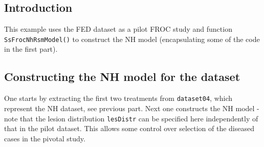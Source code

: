 \documentclass[
]{book}
\newenvironment{Shaded}{\begin{snugshade}}{\end{snugshade}}
\newcommand{\AttributeTok}[1]{\textcolor[rgb]{0.77,0.63,0.00}{#1}}
\newcommand{\CommentTok}[1]{\textcolor[rgb]{0.56,0.35,0.01}{\textit{#1}}}
\newcommand{\DecValTok}[1]{\textcolor[rgb]{0.00,0.00,0.81}{#1}}
\newcommand{\FloatTok}[1]{\textcolor[rgb]{0.00,0.00,0.81}{#1}}
\newcommand{\FunctionTok}[1]{\textcolor[rgb]{0.00,0.00,0.00}{#1}}
\newcommand{\NormalTok}[1]{#1}
\newcommand{\OtherTok}[1]{\textcolor[rgb]{0.56,0.35,0.01}{#1}}
\newcommand{\SpecialCharTok}[1]{\textcolor[rgb]{0.00,0.00,0.00}{#1}}
\begin{document}
\hypertarget{introduction}{%
\subsection{Introduction}\label{introduction}}

This example uses the FED dataset as a pilot FROC study and function \texttt{SsFrocNhRsmModel()} to construct the NH model (encapsulating some of the code in the first part).

\hypertarget{constructing-the-nh-model-for-the-dataset}{%
\subsection{Constructing the NH model for the dataset}\label{constructing-the-nh-model-for-the-dataset}}

One starts by extracting the first two treatments from \texttt{dataset04}, which represent the NH dataset, see previous part. Next one constructs the NH model - note that the lesion distribution \texttt{lesDistr} can be specified here independently of that in the pilot dataset. This allows some control over selection of the diseased cases in the pivotal study.

\begin{Shaded}
\end{Shaded}
\end{document}
